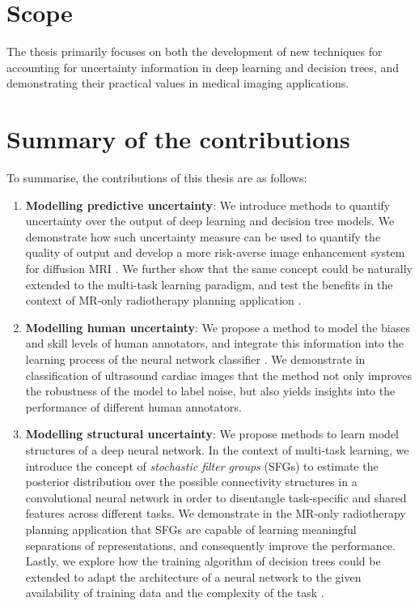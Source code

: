 \section*{Scope}
The thesis primarily focuses on both the development of new techniques for accounting for uncertainty information in deep learning and decision trees, and demonstrating their practical values in medical imaging applications. 

\section*{Summary of the contributions} 
To summarise, the contributions of this thesis are as follows:

\begin{enumerate}
	\item \textbf{Modelling predictive uncertainty}:  We introduce methods to quantify uncertainty over the output of deep learning and decision tree models. We demonstrate how such uncertainty measure can be used to quantify the quality of output and develop a more risk-averse image enhancement system for diffusion MRI \cite{tanno2016bayesian,tanno2017bayesian,tannonimg2019}.  We further show that the same concept could be naturally extended to the multi-task learning paradigm, and test the benefits in the context of MR-only radiotherapy planning application \cite{bragman2018multi}. 
	
	\item \textbf{Modelling human uncertainty}: We propose a method to model the biases and skill levels of human annotators, and integrate this information into the learning process of the neural network classifier \cite{tanno2019learning}. We demonstrate in classification of ultrasound cardiac images that the method not only improves the robustness of the model to label noise, but also yields insights into the performance of different human annotators. 
	
	\item \textbf{Modelling structural uncertainty}: We propose methods to learn model structures of a deep neural network. In the context of multi-task learning, we introduce the concept of \emph{stochastic filter  groups} (SFGs) \cite{sfg2019} to estimate the posterior distribution over the possible connectivity structures in a convolutional neural network in order to disentangle task-specific and shared features across different tasks. We demonstrate in the MR-only radiotherapy planning application that SFGs are capable of learning meaningful separations of representations, and consequently improve the performance. Lastly, we explore how the training algorithm of decision trees could be extended to adapt the architecture of a neural network to the given availability of training data and the complexity of the task \cite{AdaptiveNeuralTrees19}. 
	
\end{enumerate}

